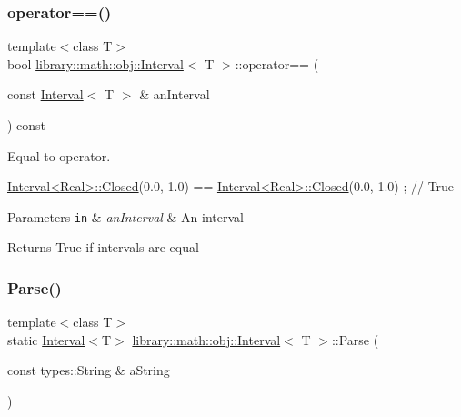 \subsubsection{\texorpdfstring{operator==()}{operator==()}}
{\footnotesize\ttfamily template$<$class T$>$ \\
bool \hyperlink{classlibrary_1_1math_1_1obj_1_1_interval}{library\+::math\+::obj\+::\+Interval}$<$ T $>$\+::operator== (\begin{DoxyParamCaption}\item[{const \hyperlink{classlibrary_1_1math_1_1obj_1_1_interval}{Interval}$<$ T $>$ \&}]{an\+Interval }\end{DoxyParamCaption}) const}



Equal to operator. 


\begin{DoxyCode}
\hyperlink{classlibrary_1_1math_1_1obj_1_1_interval_aae8bb2b89af450729338d48563def4d7}{Interval<Real>::Closed}(0.0, 1.0) == \hyperlink{classlibrary_1_1math_1_1obj_1_1_interval_aae8bb2b89af450729338d48563def4d7}{Interval<Real>::Closed}(0.0,
       1.0) ; \textcolor{comment}{// True}
\end{DoxyCode}



\begin{DoxyParams}[1]{Parameters}
\mbox{\tt in}  & {\em an\+Interval} & An interval \\
\hline
\end{DoxyParams}
\begin{DoxyReturn}{Returns}
True if intervals are equal 
\end{DoxyReturn}
\mbox{\label{classlibrary_1_1math_1_1obj_1_1_interval_a9ed15c38ee04880a1aba75defa086a79}} 
\subsubsection{\texorpdfstring{Parse()}{Parse()}}
{\footnotesize\ttfamily template$<$class T$>$ \\
static \hyperlink{classlibrary_1_1math_1_1obj_1_1_interval}{Interval}$<$T$>$ \hyperlink{classlibrary_1_1math_1_1obj_1_1_interval}{library\+::math\+::obj\+::\+Interval}$<$ T $>$\+::Parse (\begin{DoxyParamCaption}\item[{const types\+::\+String \&}]{a\+String }\end{DoxyParamCaption})\hspace{0.3cm}{\ttfamily [static]}}



